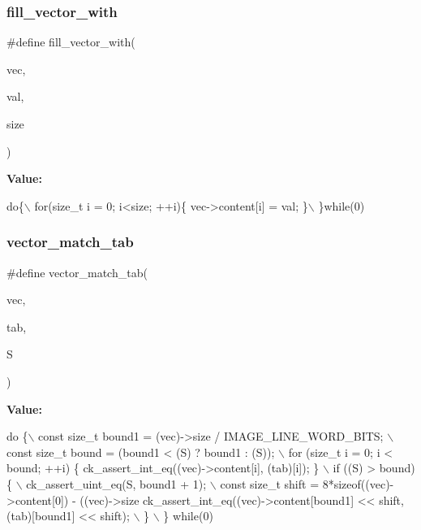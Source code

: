 \subsubsection{\texorpdfstring{fill\+\_\+vector\+\_\+with}{fill\_vector\_with}}
{\footnotesize\ttfamily \#define fill\+\_\+vector\+\_\+with(\begin{DoxyParamCaption}\item[{}]{vec,  }\item[{}]{val,  }\item[{}]{size }\end{DoxyParamCaption})}

{\bfseries Value\+:}
\begin{DoxyCode}
\textcolor{keywordflow}{do}\{\(\backslash\)
        for(\textcolor{keywordtype}{size\_t} i = 0; i<size; ++i)\{ vec->content[i] = val; \}\(\backslash\)
    \}\textcolor{keywordflow}{while}(0)
\end{DoxyCode}
\mbox{\label{unit-test-bit-vector_8c_a19ea6ecc4ee71bfae5fcff25d2af66d2}} 
\subsubsection{\texorpdfstring{vector\+\_\+match\+\_\+tab}{vector\_match\_tab}}
{\footnotesize\ttfamily \#define vector\+\_\+match\+\_\+tab(\begin{DoxyParamCaption}\item[{}]{vec,  }\item[{}]{tab,  }\item[{}]{S }\end{DoxyParamCaption})}

{\bfseries Value\+:}
\begin{DoxyCode}
\textcolor{keywordflow}{do} \{\(\backslash\)
        const \textcolor{keywordtype}{size\_t} bound1 = (vec)->size / IMAGE\_LINE\_WORD\_BITS; \(\backslash\)
        const \textcolor{keywordtype}{size\_t} bound = (bound1 < (S) ? bound1 : (S));       \(\backslash\)
        for (\textcolor{keywordtype}{size\_t} i = 0; i < bound; ++i) \{ ck\_assert\_int\_eq((vec)->content[i], (tab)[i]); \} \(\backslash\)
        if ((S) > bound) \{ \(\backslash\)
            ck\_assert\_uint\_eq(S, bound1 + 1); \(\backslash\)
            const \textcolor{keywordtype}{size\_t} shift = 8*\textcolor{keyword}{sizeof}((vec)->content[0]) - ((vec)->size %
            ck\_assert\_int\_eq((vec)->content[bound1] << shift, (tab)[bound1] << shift); \(\backslash\)
        \} \(\backslash\)
    \} \textcolor{keywordflow}{while}(0)
\end{DoxyCode}
\mbox{\label{unit-test-bit-vector_8c_a9032b05ae6443409f6086dc32356289f}} 
